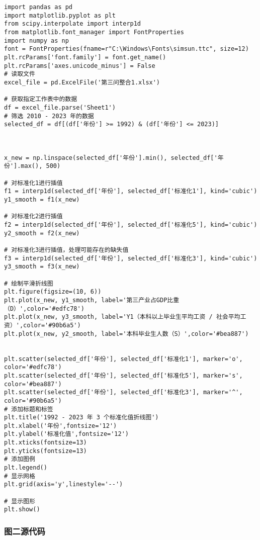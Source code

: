 \documentclass[withoutpreface,bwprint]{cumcmthesis} %
\begin{document}
\begin{verbatim}
import pandas as pd
import matplotlib.pyplot as plt
from scipy.interpolate import interp1d
from matplotlib.font_manager import FontProperties
import numpy as np
font = FontProperties(fname=r"C:\Windows\Fonts\simsun.ttc", size=12)
plt.rcParams['font.family'] = font.get_name()
plt.rcParams['axes.unicode_minus'] = False
# 读取文件
excel_file = pd.ExcelFile('第三问整合1.xlsx')

# 获取指定工作表中的数据
df = excel_file.parse('Sheet1')
# 筛选 2010 - 2023 年的数据
selected_df = df[(df['年份'] >= 1992) & (df['年份'] <= 2023)]



x_new = np.linspace(selected_df['年份'].min(), selected_df['年份'].max(), 500)

# 对标准化1进行插值
f1 = interp1d(selected_df['年份'], selected_df['标准化1'], kind='cubic')
y1_smooth = f1(x_new)

# 对标准化2进行插值
f2 = interp1d(selected_df['年份'], selected_df['标准化5'], kind='cubic')
y2_smooth = f2(x_new)

# 对标准化3进行插值，处理可能存在的缺失值
f3 = interp1d(selected_df['年份'], selected_df['标准化3'], kind='cubic')
y3_smooth = f3(x_new)

# 绘制平滑折线图
plt.figure(figsize=(10, 6))
plt.plot(x_new, y1_smooth, label='第三产业占GDP比重（D）',color='#edfc78')
plt.plot(x_new, y3_smooth, label='Y1（本科以上毕业生平均工资 / 社会平均工资）',color='#90b6a5')
plt.plot(x_new, y2_smooth, label='本科毕业生人数（S）',color='#bea887')


plt.scatter(selected_df['年份'], selected_df['标准化1'], marker='o', color='#edfc78')
plt.scatter(selected_df['年份'], selected_df['标准化5'], marker='s', color='#bea887')
plt.scatter(selected_df['年份'], selected_df['标准化3'], marker='^', color='#90b6a5')
# 添加标题和标签
plt.title('1992 - 2023 年 3 个标准化值折线图')
plt.xlabel('年份',fontsize='12')
plt.ylabel('标准化值',fontsize='12')
plt.xticks(fontsize=13)
plt.yticks(fontsize=13)
# 添加图例
plt.legend()
# 显示网格
plt.grid(axis='y',linestyle='--')

# 显示图形
plt.show()
\end{verbatim}


\subsubsection{图二源代码}
\end{document}
